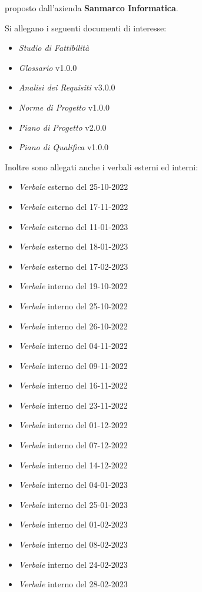 \documentclass[10pt]{article}
\begin{document}
proposto dall’azienda \textbf{Sanmarco Informatica}.


Si allegano i seguenti documenti di interesse:
\begin{itemize}
  \item \textit{\textit{Studio di Fattibilità}}
  \item \textit{Glossario} v1.0.0
  \item \textit{Analisi dei Requisiti} v3.0.0
  \item \textit{Norme di Progetto} v1.0.0
  \item \textit{Piano di Progetto} v2.0.0
  \item \textit{Piano di Qualifica} v1.0.0
\end{itemize}

Inoltre sono allegati anche i verbali esterni ed interni:

\begin{itemize}
  \item \textit{Verbale} esterno del 25-10-2022
  \item \textit{Verbale} esterno del 17-11-2022
  \item \textit{Verbale} esterno del 11-01-2023
  \item \textit{Verbale} esterno del 18-01-2023
  \item \textit{Verbale} esterno del 17-02-2023
  \item \textit{Verbale} interno del 19-10-2022
  \item \textit{Verbale} interno del 25-10-2022
  \item \textit{Verbale} interno del 26-10-2022
  \item \textit{Verbale} interno del 04-11-2022
  \item \textit{Verbale} interno del 09-11-2022
  \item \textit{Verbale} interno del 16-11-2022
  \item \textit{Verbale} interno del 23-11-2022
  \item \textit{Verbale} interno del 01-12-2022
  \item \textit{Verbale} interno del 07-12-2022
  \item \textit{Verbale} interno del 14-12-2022
  \item \textit{Verbale} interno del 04-01-2023
  \item \textit{Verbale} interno del 25-01-2023
  \item \textit{Verbale} interno del 01-02-2023
  \item \textit{Verbale} interno del 08-02-2023
  \item \textit{Verbale} interno del 24-02-2023
  \item \textit{Verbale} interno del 28-02-2023
\end{itemize}
\end{document}
